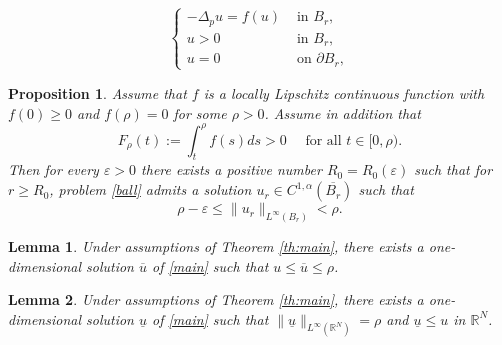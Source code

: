\documentclass[10pt,a4paper]{amsart}
\newtheorem{proposition}{Proposition}
\newtheorem{lemma}{Lemma}
\begin{document}
	\begin{equation}\label{ball}
		\begin{cases}
			-\Delta_p u = f(u) &\text{ in } B_r,\\
			u > 0 &\text{ in } B_r,\\
			u = 0 &\text{ on } \partial B_r,
		\end{cases}
	\end{equation}

	\begin{proposition}\label{prop:ball}
		Assume that $f$ is a locally Lipschitz continuous function with $f (0) \ge 0$ and $f(\rho) = 0$ for some $\rho > 0$. Assume in addition that
		\[
		F_\rho(t):=\int_{t}^{\rho} f(s) ds > 0 \quad\text{ for all } t \in [0, \rho).
		\]
		Then for every $\varepsilon > 0$ there exists a positive number
		$R_0 = R_0(\varepsilon)$ such that for $r \ge R_0$, problem \eqref{ball} admits a solution $u_r \in C^{1,\alpha}(\overline{B_r})$ such that
		\[
		\rho - \varepsilon \le \|u_r\|_{L^\infty(B_r)} < \rho.
		\]
	\end{proposition}

	\begin{lemma}\label{lem:upper}
		Under assumptions of Theorem \ref{th:main}, there exists a one-dimensional solution $\overline u$ of \eqref{main} such that $u \le \overline u \le \rho$.
	\end{lemma}

	\begin{lemma}\label{lem:lower}
		Under assumptions of Theorem \ref{th:main}, there exists a one-dimensional solution $\underline u$ of \eqref{main} such that $\|\underline u\|_{L^\infty(\mathbb{R}^N)}=\rho$ and $\underline u \le u$ in $\mathbb{R}^N$.
	\end{lemma}
\end{document}
